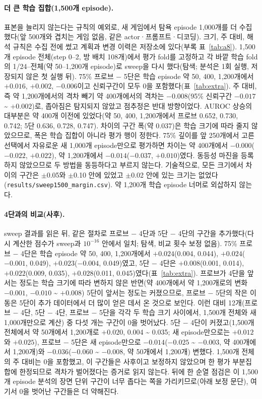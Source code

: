\documentclass[11pt]{article}
\begin{document}
\paragraph{더 큰 학습 집합(1,500개 episode).} 표본을 늘리지 않는다는 규칙의 예외로, 새 게임에서 탐욕 episode 1,000개를 더 수집했다(앞 500개와 겹치는 게임 없음, 같은 actor·프롬프트·디코딩). 크기, 주 대비, 해석 규칙은 수집 전에 썼고 계획과 변경 이력은 저장소에 있다(부록 표~\ref{tab:a8}). 1,500개 episode 전체(step 0--2, 방 배치 108개)에서 평가 fold를 고정하고 각 바깥 학습 fold의 1/24--전체(약 50--1,200개 episode)로 sweep을 다시 했다(탐색; 분석은 1회 실행, 저장되지 않은 첫 실행 뒤). 75\% 프로브 $-$ 5단은 학습 episode 약 50, 400, 1,200개에서 $+0.016$, $+0.002$, $-0.006$이고 신뢰구간이 모두 0을 포함했다(표~\ref{tab:extra}). 주 대비, 즉 약 1,200개에서의 격차 빼기 약 400개에서의 격차는 $-0.008$(95\% 신뢰구간 $-0.017$ \textasciitilde{} $+0.002$)로, 좁아짐은 탐지되지 않았고 점추정은 반대 방향이었다. AUROC 상승의 대부분은 약 400개 이전에 있었다(약 50, 400, 1,200개에서 프로브 0.652, 0.730, 0.742; 5단 0.636, 0.728, 0.747). 차이의 구간 폭(약 0.037)은 학습 크기에 따라 줄지 않았으므로, 폭은 학습 집합이 아니라 평가 행이 정한다. 75\% 깊이를 앞 250개에서 고른 선택에서 자유로운 새 1,000개 episode만으로 평가하면 차이는 약 400개에서 $-0.000$($-0.022$, $+0.022$), 약 1,200개에서 $-0.014$($-0.037$, $+0.010$)였다. 동등성 마진을 등록하지 않았으므로 두 방법을 동등하다고 부르지 않는다. 기술적으로, 모든 크기에서 차이의 구간은 $\pm$0.05와 $\pm$0.10 안에 있었고 $\pm$0.02 안에 있는 크기는 없었다(\texttt{results/sweep1500\_margin.csv}). 약 1,200개 학습 episode 너머로 외삽하지 않는다.

\paragraph{4단과의 비교(사후).} sweep 결과를 읽은 뒤, 같은 절차로 프로브 $-$ 4단과 5단 $-$ 4단의 구간을 추가했다(다시 계산한 점수가 sweep과 $10^{-16}$ 안에서 일치; 탐색, 비교 횟수 보정 없음). 75\% 프로브 $-$ 4단은 학습 episode 약 50, 400, 1,200개에서 $+0.024$(0.004, 0.044), $+0.024$($-0.001$, 0.049), $+0.023$($-0.004$, 0.049)였고, 5단 $-$ 4단은 $+0.008$(0.001, 0.014), $+0.022$(0.009, 0.035), $+0.028$(0.011, 0.045)였다(표~\ref{tab:extra}). 프로브가 4단을 앞서는 정도는 학습 크기에 따라 변하지 않은 반면(약 400개에서 약 1,200개로의 변화 $-0.001$, $-0.010$ \textasciitilde{} $+0.008$) 5단이 앞서는 정도는 커졌으므로, 프로브 $-$ 5단의 작은 이동은 5단이 추가 데이터에서 더 많이 얻은 데서 온 것으로 보인다. 이런 대비 12개(프로브 $-$ 4단, 5단 $-$ 4단, 프로브 $-$ 5단을 각각 두 학습 크기 사이에서, 1,500개 전체와 새 1,000개만으로 계산) 중 다섯 개는 구간이 0을 벗어났다. 5단 $-$ 4단이 커졌고(1,500개 전체에서 약 50개에서 1,200개로 $+0.020$, 0.004 \textasciitilde{} 0.035; 새 episode만으로는 $+0.012$와 $+0.025$), 프로브 $-$ 5단은 새 episode만으로 $-0.014$($-0.025$ \textasciitilde{} $-0.003$, 약 400개에서 1,200개)와 $-0.036$($-0.060$ \textasciitilde{} $-0.008$, 약 50개에서 1,200개) 변했다. 1,500개 전체의 주 대비는 0을 포함했고, 이 구간들은 사후이고 보정하지 않았으며 한 평가 부분집합에 한정되므로 격차가 벌어졌다는 증거로 읽지 않는다. 뒤에 한 순열 점검은 이 1,500개 episode 분석의 장면 단위 구간이 너무 좁다는 쪽을 가리키므로(아래 보정 문단), 여기서 0을 벗어난 구간들은 더 약해진다.
\end{document}
